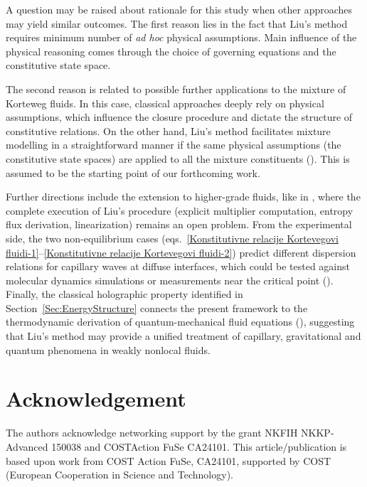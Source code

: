 \documentclass[a4paper,fleqn]{cas-sc}
\theoremstyle{definition}
\begin{document}
A question may be raised about rationale for this study when other approaches may yield similar outcomes. The first reason lies in the fact that Liu's method requires minimum number of \emph{ad hoc} physical assumptions. Main influence of the physical reasoning comes through the choice of governing equations and the constitutive state space. 

The second reason is related to possible further applications to the mixture of Korteweg fluids. In this case, classical approaches deeply rely on physical assumptions, which influence the closure procedure and dictate the structure of constitutive relations. On the other hand, Liu's method facilitates mixture modelling in a straightforward manner if the same physical assumptions (the constitutive state spaces) are applied to all the mixture constituents (\cite{ruggeri2007hyperbolic}). This is assumed to be the starting point of our forthcoming work.

Further directions include the extension to higher-grade fluids, like in \cite{gorgone2021characterization,morro2023korteweg,paolucci2022second}, where the complete execution of Liu's procedure (explicit multiplier computation, entropy flux derivation, linearization) remains an open problem. From the experimental side, the two non-equilibrium cases (eqs.\ \eqref{Konstitutivne relacije Kortevegovi fluidi-1}--\eqref{Konstitutivne relacije Kortevegovi fluidi-2}) predict different dispersion relations for capillary waves at diffuse interfaces, which could be tested against molecular dynamics simulations or measurements near the critical point (\cite{bhattacharjee2025thermodynamically}). Finally, the classical holographic property identified in Section~\ref{Sec:EnergyStructure} connects the present framework to the thermodynamic derivation of quantum-mechanical fluid equations (\cite{szucs2025thermodynamic,van2023holographic}), suggesting that Liu's method may provide a unified treatment of capillary, gravitational and quantum phenomena in weakly nonlocal fluids.

\section{Acknowledgement}

The authors acknowledge networking support by the grant   NKFIH NKKP-Advanced 150038 and COSTAction FuSe CA24101. This article/publication is based upon work from COST Action    FuSe, CA24101, supported by COST (European Cooperation in Science and Technology).
\end{document}
